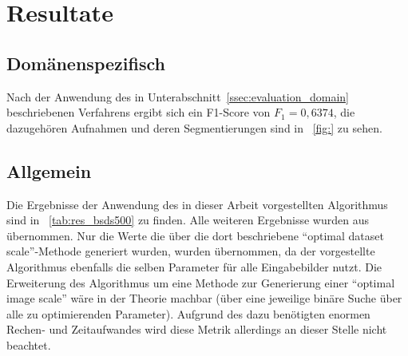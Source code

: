 

\section{Resultate}
\label{sec:results}

\subsection{Domänenspezifisch}
\label{ssec:results_domain}

Nach der Anwendung des in Unterabschnitt~\ref{ssec:evaluation_domain} beschriebenen Verfahrens ergibt sich ein F1-Score von $F_1=0,6374$, die dazugehören Aufnahmen und deren Segmentierungen sind in \figurename~\ref{fig:} zu sehen.


\subsection{Allgemein}
\label{ssec:results_general}
Die Ergebnisse der Anwendung des in dieser Arbeit vorgestellten Algorithmus sind in \tablename~\ref{tab:res_bsds500} zu finden. Alle weiteren Ergebnisse wurden aus \cite{arbelaez_10} übernommen. Nur die Werte die über die dort beschriebene \enquote{optimal dataset scale}-Methode generiert wurden, wurden übernommen, da der vorgestellte Algorithmus ebenfalls die selben Parameter für alle Eingabebilder nutzt. Die Erweiterung des Algorithmus um eine Methode zur Generierung einer \enquote{optimal image scale} wäre in der Theorie machbar (\bspw über eine jeweilige binäre Suche über alle zu optimierenden Parameter). Aufgrund des dazu benötigten enormen Rechen- und Zeitaufwandes wird diese Metrik allerdings an dieser Stelle nicht beachtet.


